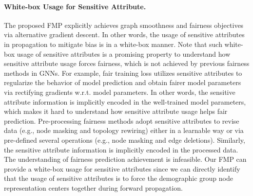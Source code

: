 \documentclass[letterpaper]{article} %
\theoremstyle{plain}
\theoremstyle{definition}
\theoremstyle{remark}
\begin{document}
\paragraph{White-box Usage for Sensitive Attribute.} The proposed FMP explicitly achieves graph smoothness and fairness objectives via alternative gradient descent. In other words, the usage of sensitive attributes in propagation to mitigate bias is in a white-box manner. Note that such white-box usage of sensitive attributes is a promising property to understand how sensitive attribute usage forces fairness, which is not achieved by previous fairness methods in GNNs. For example, fair training loss utilizes sensitive attributes to regularize the behavior of model prediction and obtain fairer model parameters via rectifying gradients w.r.t. model parameters. In other words, the sensitive attribute information is implicitly encoded in the well-trained model parameters, which makes it hard to understand how sensitive attribute usage helps fair prediction.  Pre-processing fairness methods adopt sensitive attributes to revise data (e.g., node masking and topology rewiring) either in a learnable way or via pre-defined several operations (e.g., node masking and edge deletions). Similarly, the sensitive attribute information is implicitly encoded in the processed data. The understanding of fairness prediction achievement is infeasible. Our FMP can provide a white-box usage for sensitive attributes since we can directly identify that the usage of sensitive attributes is to force the demographic group node representation centers together during forward propagation. 
\end{document}

